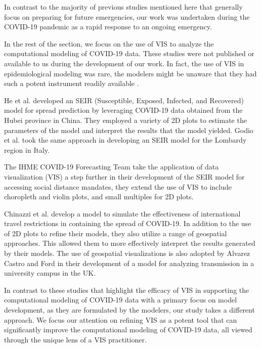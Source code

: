 In contrast to the majority of previous studies mentioned here that generally focus on preparing for future emergencies, our work was undertaken during the COVID-19 pandemic as a rapid response to an ongoing emergency.


In the rest of the section, we focus on the use of \ac{VIS} to analyze the computational modeling of COVID-19 data.
These studies were not published or available to us during the development of our work.
In fact, the use of VIS in epidemiological modeling was rare, the modelers might be unaware that they had such a potent instrument readily available \cite{chen2022RAMPVIS}.

He et al. \cite{he2020SEIR} developed an SEIR (Susceptible, Exposed, Infected, and Recovered) model for spread prediction by leveraging COVID-19 data obtained from the Hubei province in China.
They employed a variety of 2D plots to estimate the parameters of the model and interpret the results that the model yielded. Godio et al. \cite{godio2020SEIR} took the same approach in developing an SEIR model for the Lombardy region in Italy.

The IHME COVID-19 Forecasting Team \cite{ihmecovid-19forecastingteam2021Modeling} take the application of data visualization (VIS) a step further in their development of the SEIR model for accessing social distance mandates, they extend the use of \ac{VIS} to include choropleth and violin plots, and small multiples for 2D plots.

Chinazzi et al. \cite{chinazzi2020Effect} develop a model to simulate the effectiveness of international travel restrictions in containing the spread of COVID-19.
In addition to the use of 2D plots to refine their models, they also utilize a range of geospatial approaches.
This allowed them to more effectively interpret the results generated by their models.
The use of geospatial visualizations is also adopted by Alvarez Castro and Ford \cite{alvarezcastro20213D} in their development of a model for analyzing transmission in a university campus in the UK.

In contrast to these studies that highlight the efficacy of \ac{VIS} in supporting the computational modeling of COVID-19 data with a primary focus on model development, as they are formulated by the modelers, our study takes a different approach.
We focus our attention on refining \ac{VIS} as a potent tool that can significantly improve the computational modeling of COVID-19 data, all viewed through the unique lens of a \ac{VIS} practitioner.

